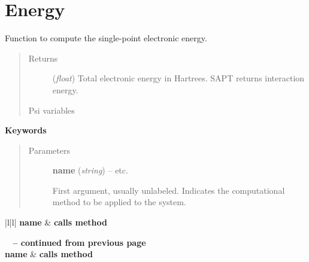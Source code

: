 \documentclass[letterpaper,10pt,english]{sphinxmanual}
\begin{document}
\chapter{Energy}
\label{index:energy}\label{index:general}

\begin{fulllineitems}
\label{index:driver.energy}
Function to compute the single-point electronic energy.
\begin{quote}\begin{description}
\item[{Returns}] \leavevmode
(\emph{float}) Total electronic energy in Hartrees. SAPT returns interaction energy.

\item[{Psi variables}] \leavevmode
\end{description}\end{quote}

\begin{fulllineitems}
\label{index:envvar-CURRENTENERGY}\label{index:envvar-CURRENTREFERENCEENERGY}\label{index:envvar-CURRENTCORRELATIONENERGY}
\end{fulllineitems}


\textbf{Keywords}
\begin{quote}\begin{description}
\item[{Parameters}] \leavevmode
\textbf{name} (\emph{string}) -- 
 \textbar{}\textbar{}  \textbar{}\textbar{}  \textbar{}\textbar{} etc.

First argument, usually unlabeled. Indicates the computational method 
to be applied to the system.


\end{description}\end{quote}

\begin{longtable}{|l|l|}
\hline
\textbf{
name
} & \textbf{
calls method
}\\\hline
\endfirsthead

%
{{\bfseries \tablename\ \thetable{} -- continued from previous page}} \\
\hline
\textbf{
name
} & \textbf{
calls method
}\\\hline
\endhead


\end{longtable}
\end{fulllineitems}
\end{document}
